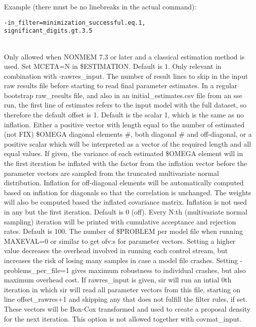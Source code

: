 \begin{optionlist}
Example (there must be no linebreaks in the actual command):
\begin{verbatim}
-in_filter=minimization_successful.eq.1,
significant_digits.gt.3.5
\end{verbatim} \\
\nextopt
{}
Only allowed when NONMEM 7.3 or later and a classical estimation method is used. Set MCETA=N in \$ESTIMATION.
\nextopt
{}
Default is 1. Only relevant in combination with -rawres\_input. The number of result lines to skip in the input raw results file before starting to read final parameter estimates. In a regular bootstrap raw\_results file, and also in an initial\_estimates.csv file from an sse run, the first line of estimates refers to the input model with the full dataset, so therefore the default offset is 1.
\nextopt
{}
Default is the scalar 1, which is the same as no inflation. Either a positive vector with length equal to the number of estimated (not FIX) \$OMEGA diagonal elements \#, both diagonal \# and off-diagonal, or a positive scalar which will be interpreted as a vector of the required length and all equal values. If given, the variance of each estimated \$OMEGA element will in the first iteration be inflated with the factor from the inflation vector before the parameter vectors are sampled from the truncated multivariate normal distribution. Inflation for off-diagonal elements will be automatically computed based on inflation for diagonals so that the correlation is unchanged. The weights will also be computed based the inflated covariance matrix. Inflation is not used in any but the first iteration.
\nextopt
{}
Default is 0 (off). Every N:th (multivariate normal sampling) iteration will be printed with cumulative acceptance and rejection rates.
\nextopt
{}
Default is 100. The number of \$PROBLEM per model file when running MAXEVAL=0 or similar to get ofv:s for parameter vectors. Setting a higher value decreases the overhead involved in running each control stream, but increases the risk of losing many samples in case a model file crashes. Setting -problems\_per\_file=1 gives maximum robustness to individual crashes, but also maximum overhead cost.
\nextopt
{}
If rawres\_input is given, sir will run an intial 0th iteration in which sir will read all parameter vectors from this file, starting on line offset\_rawres+1 and skipping any that does not fulfill the filter rules, if set. These vectors will be Box-Cox transformed and used to create a proposal density for the next iteration. This option is not allowed together with covmat\_input.


\end{optionlist}
